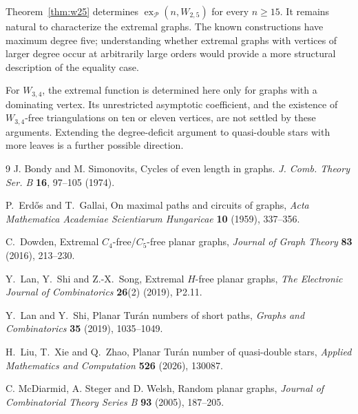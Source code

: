 \documentclass[11pt,a4paper]{article}
\theoremstyle{remark}
\newcommand{\ex}{\operatorname{ex}}
\newcommand{\PP}{\mathcal P}
\begin{document}
Theorem~\ref{thm:w25} determines $\ex_{\PP}(n,W_{2,5})$ for every $n\ge15$. It remains natural to characterize the extremal graphs. The known constructions have maximum degree five; understanding whether extremal graphs with vertices of larger degree occur at arbitrarily large orders would provide a more structural description of the equality case.

For $W_{3,4}$, the extremal function is determined here only for graphs with a dominating vertex. Its unrestricted asymptotic coefficient, and the existence of $W_{3,4}$-free triangulations on ten or eleven vertices, are not settled by these arguments. Extending the degree-deficit argument to quasi-double stars with more leaves is a further possible direction.

\begin{thebibliography}{9}
J. Bondy  and M. Simonovits,  Cycles of even length in graphs. \emph{J. Comb. Theory Ser. B} \textbf{16}, 97–105 (1974).

P.~Erd\H{o}s and T.~Gallai, On maximal paths and circuits of graphs, \emph{Acta Mathematica Academiae Scientiarum Hungaricae} \textbf{10} (1959), 337--356. 

C.~Dowden, Extremal $C_4$-free/$C_5$-free planar graphs, \emph{Journal of Graph Theory} \textbf{83} (2016), 213--230. 

Y.~Lan, Y.~Shi and Z.-X.~Song, Extremal $H$-free planar graphs, \emph{The Electronic Journal of Combinatorics} \textbf{26}(2) (2019), P2.11. %

Y.~Lan and Y.~Shi, Planar Tur\'an numbers of short paths, \emph{Graphs and Combinatorics} \textbf{35} (2019), 1035--1049. 

H.~Liu, T.~Xie and Q.~Zhao, Planar Tur\'an number of quasi-double stars, \emph{Applied Mathematics and Computation} \textbf{526} (2026), 130087. %

C. McDiarmid, A. Steger and D. Welsh, Random planar graphs, \emph{Journal of
Combinatorial Theory Series B} \textbf{93} (2005), 187–205.


\end{thebibliography}
\end{document}
